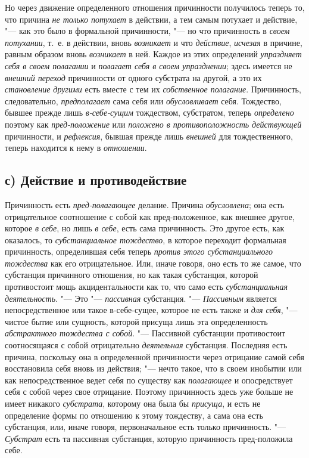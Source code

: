 Но через движение определенного отношения причинности получилось теперь то,
что причина {\em не только потухает} в действии, а тем
самым потухает и действие, "--- как это было в формальной причинности, "--- но
что причинность в {\em своем потухании}, т.~е. в
действии, вновь {\em возникает} и что
{\em действие}, {\em исчезая} в
причине, равным образом вновь {\em возникает} в ней.
Каждое из этих определений {\em упраздняет себя в своем
полагании} и {\em полагает себя в своем упразднении};
здесь имеется не {\em внешний переход} причинности от
одного субстрата на другой, а это их {\em становление
другими} есть вместе с тем их {\em собственное
полагание}. Причинность, следовательно,
{\em предполагает} сама себя или
{\em обусловливает} себя. Тождество, бывшее прежде лишь
{\em в-себе-сущим} тождеством, субстратом, теперь
{\em определено} поэтому как
{\em пред-положение} или
{\em положено в противоположность действующей}
причинности, и {\em рефлексия}, бывшая прежде лишь
{\em внешней} для тождественного, теперь находится к
нему в {\em отношении}.


\subsection[с) Действие и противодействие]{с) Действие и противодействие}

Причинность есть
{\em пред-полагающее} делание. Причина
{\em обусловлена}; она есть отрицательное соотношение с
собой как пред-положенное, как внешнее другое, которое
{\em в себе}, но лишь {\em в себе},
есть сама причинность. Это другое есть, как оказалось, то
{\em субстанциальное тождество}, в которое переходит
формальная причинность, определившая себя теперь
{\em против этого субстанциального тождества} как его
отрицательное. Или, иначе говоря, оно есть то же самое, что субстанция
причинного отношения, но как такая субстанция, которой противостоит мощь
акцидентальности как то, что само есть
{\em субстанциальная деятельность}. "--- Это
"--- {\em пассивная} субстанция. "---
{\em Пассивным} является непосредственное или такое
в-себе-сущее, которое не есть также и {\em для себя}, "---
чистое бытие или сущность, которой присуща лишь эта определенность
{\em абстрактного тождества с собой}. "--- Пассивной
субстанции противостоит соотносящаяся с собой отрицательно
{\em деятельная} субстанция. Последняя есть причина,
поскольку она в определенной причинности через отрицание самой себя
восстановила себя вновь из действия; "--- нечто такое, что в своем инобытии или
как непосредственное ведет себя по существу как
{\em полагающее} и опосредствует себя с собой через
свое отрицание. Поэтому причинность здесь уже больше не имеет никакого
{\em субстрата}, которому она была бы
{\em присуща}, и есть не определение формы по отношению
к этому тождеству, а сама она есть субстанция, или, иначе говоря,
первоначальное есть только причинность. "---
{\em Субстрат} есть та пассивная субстанция, которую
причинность пред-положила себе.

